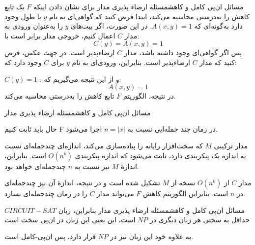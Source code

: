 \begin{itemframe-s}{مسائل ان‌پی کامل و کاهش}{مسئله ارضاء پذیری مدار}
\itm
برای نشان دادن اینکه $F$ یک تابع کاهش را به‌درستی محاسبه می‌کند، ابتدا فرض کنید که گواهی‌ای به نام $y$ با طول وجود دارد به‌گونه‌ای که
$A(x, y) = 1$.
در این صورت، اگر بیت‌های $y$ را به‌عنوان ورودی به مدار $C$ اعمال کنیم، خروجی مدار برابر است با:
$$
C(y) = A(x, y) = 1
$$
پس اگر گواهی‌ای وجود داشته باشد، مدار $C$ ارضاء‌پذیر است.
\itm
در جهت عکس، فرض کنید که مدار $C$ ارضاءپذیر است. بنابراین، ورودی‌ای به نام $y$ برای $C$ وجود دارد که:

$C(y)=1$ .
و از این نتیجه می‌گیریم که:
$$A(x,y)=1$$
\itm
در نتیجه، الگوریتم $F$ تابع کاهش را به‌درستی محاسبه می‌کند.
\end{itemframe-s}

\begin{itemframe-s}{مسائل ان‌پی کامل و کاهش}{مسئله ارضاء پذیری مدار}

\itm
حال باید ثابت کنیم F در زمان چند جمله‌ایی نسبت به
$n = |x|$
اجرا می‌شود.

\itm
مدار ترکیبی $M$ که سخت‌افزار رایانه را پیاده‌سازی می‌کند، اندازه‌ای چندجمله‌ای نسبت به اندازه یک پیکربندی دارد، ثابت می‌شود که اندازه پیکربندی
$O(n^k)$
است. بنابراین، اندازهٔ $M$ نیز نسبت به $n$ چندجمله‌ای خواهد بود.

\itm
مدار $C$ از
$O(n^k)$
نسخه از $M$ تشکیل شده است و در نتیجه، اندازهٔ آن نیز چندجمله‌ای در $n$ است.
بنابراین الگوریتم کاهش $F$ می‌تواند مدار $C$ را در زمان چندجمله‌ای بسازد.

\end{itemframe-s}

\begin{itemframe-s}{مسائل ان‌پی کامل و کاهش}{مسئله ارضاء پذیری مدار}
\itm
بنابراین، زبان $CIRCUIT-SAT$ حداقل به سختی هر زبان دیگری در $NP$ است، این یعنی این زبان در ان‌پی سخت است

\itm
به علاوه خود این زبان نیز در
$NP$
قرار دارد، پس ان‌پی‌-کامل است.

\end{itemframe-s}
